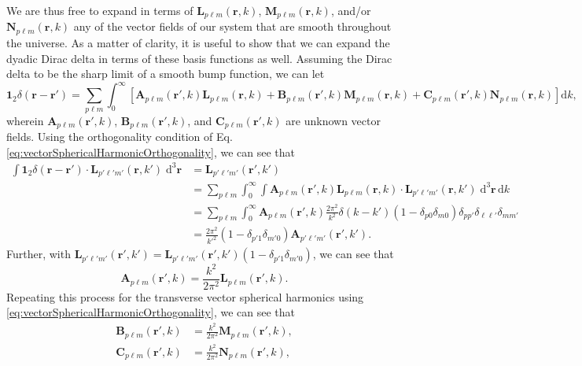 We are thus free to expand in terms of $\mathbf{L}_{p\ell m}(\mathbf{r},k)$, $\mathbf{M}_{p\ell m}(\mathbf{r},k)$, and/or $\mathbf{N}_{p\ell m}(\mathbf{r},k)$ any of the vector fields of our system that are smooth throughout the universe. As a matter of clarity, it is useful to show that we can expand the dyadic Dirac delta in terms of these basis functions as well. Assuming the Dirac delta to be the sharp limit of a smooth bump function, we can let 
\begin{equation}
\bm{1}_2\delta(\mathbf{r} - \mathbf{r}') = \sum_{p\ell m}\int_0^\infty\left[\mathbf{A}_{p\ell m}(\mathbf{r}',k)\mathbf{L}_{p\ell m}(\mathbf{r},k) + \mathbf{B}_{p\ell m}(\mathbf{r}',k)\mathbf{M}_{p\ell m}(\mathbf{r},k) + \mathbf{C}_{p\ell m}(\mathbf{r}',k)\mathbf{N}_{p\ell m}(\mathbf{r},k)\right]\mathrm{d}k,
\end{equation}
wherein $\mathbf{A}_{p\ell m}(\mathbf{r}',k)$, $\mathbf{B}_{p\ell m}(\mathbf{r}',k)$, and $\mathbf{C}_{p\ell m}(\mathbf{r}',k)$ are unknown vector fields. Using the orthogonality condition of Eq. \eqref{eq:vectorSphericalHarmonicOrthogonality}, we can see that
\begin{equation}
\begin{split}
\int\bm{1}_2\delta(\mathbf{r} - \mathbf{r}')\cdot\mathbf{L}_{p'\ell'm'}(\mathbf{r},k')\;\mathrm{d}^3\mathbf{r} &= \mathbf{L}_{p'\ell'm'}(\mathbf{r}',k')\\
&= \sum_{p\ell m}\int_0^\infty\int\mathbf{A}_{p\ell m}(\mathbf{r}',k)\mathbf{L}_{p\ell m}(\mathbf{r},k)\cdot\mathbf{L}_{p'\ell'm'}(\mathbf{r},k')\;\mathrm{d}^3\mathbf{r}\,\mathrm{d}k\\
&= \sum_{p\ell m}\int_0^\infty\mathbf{A}_{p\ell m}(\mathbf{r}',k)\frac{2\pi^2}{k^2}\delta(k - k')(1 - \delta_{p0}\delta_{m0})\delta_{pp'}\delta_{\ell\ell'}\delta_{mm'}\\
&= \frac{2\pi^2}{k'^2}(1 - \delta_{p'1}\delta_{m'0})\mathbf{A}_{p'\ell'm'}(\mathbf{r}',k').
\end{split}
\end{equation}
Further, with $\mathbf{L}_{p'\ell'm'}(\mathbf{r}',k') = \mathbf{L}_{p'\ell'm'}(\mathbf{r}',k')(1 - \delta_{p'1}\delta_{m'0})$, we can see that
\begin{equation}
\mathbf{A}_{p\ell m}(\mathbf{r}',k) = \frac{k^2}{2\pi^2}\mathbf{L}_{p\ell m}(\mathbf{r}',k).
\end{equation}
Repeating this process for the transverse vector spherical harmonics using \eqref{eq:vectorSphericalHarmonicOrthogonality}, we can see that
\begin{equation}
\begin{split}
\mathbf{B}_{p\ell m}(\mathbf{r}',k) &= \frac{k^2}{2\pi^2}\mathbf{M}_{p\ell m}(\mathbf{r}',k),\\
\mathbf{C}_{p\ell m}(\mathbf{r}',k) &= \frac{k^2}{2\pi^2}\mathbf{N}_{p\ell m}(\mathbf{r}',k),
\end{split}
\end{equation}

